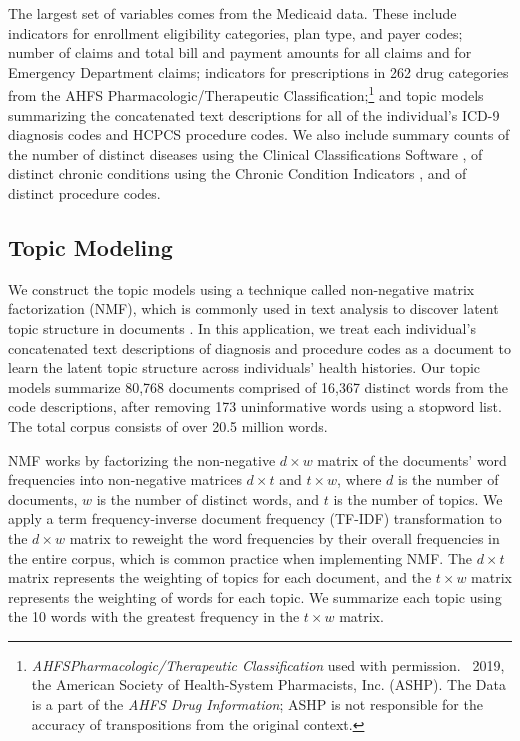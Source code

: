 \documentclass[9pt,twoside]{pnas-new}
\begin{document}
The largest set of variables comes from the Medicaid data. These include indicators for enrollment eligibility categories, plan type, and payer codes; number of claims and total bill and payment amounts for all claims and for Emergency Department claims; indicators for prescriptions in 262 drug categories from the AHFS Pharmacologic/Therapeutic Classification;\footnote{{\em AHFS\textsuperscript \textregistered Pharmacologic/Therapeutic Classification\textsuperscript \textcopyright} used with permission. \textcopyright\ 2019, the American Society of Health-System Pharmacists, Inc. (ASHP). The Data is a part of the {\em AHFS Drug Information\textsuperscript \textregistered}; ASHP is not responsible for the accuracy of transpositions from the original context.} and topic models summarizing the concatenated text descriptions for all of the individual's ICD-9 diagnosis codes and HCPCS procedure codes. We also include summary counts of the number of distinct diseases using the Clinical Classifications Software \cite{ccs}, of distinct chronic conditions using the Chronic Condition Indicators \cite{cci}, and of distinct procedure codes.

\subsection{Topic Modeling}

We construct the topic models using a technique called non-negative matrix factorization (NMF), which is commonly used in text analysis to discover latent topic structure in documents \cite{fevotte}. In this application, we treat each individual's concatenated text descriptions of diagnosis and procedure codes as a document to learn the latent topic structure across individuals' health histories. Our topic models summarize 80,768 documents comprised of 16,367 distinct words from the code descriptions, after removing 173 uninformative words using a stopword list. The total corpus consists of over 20.5 million words.

NMF works by factorizing the non-negative $d \times w$ matrix of the documents' word frequencies into non-negative matrices $d \times t$ and $t \times w$, where $d$ is the number of documents, $w$ is the number of distinct words, and $t$ is the number of topics. We apply a term frequency-inverse document frequency (TF-IDF) transformation to the $d \times w$ matrix to reweight the word frequencies by their overall frequencies in the entire corpus, which is common practice when implementing NMF. The $d \times t$ matrix represents the weighting of topics for each document, and the $t \times w$ matrix represents the weighting of words for each topic. We summarize each topic using the 10 words with the greatest frequency in the $t \times w$ matrix.
\end{document}

